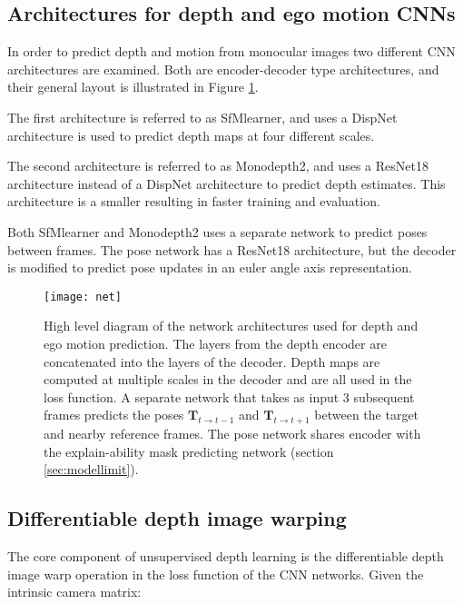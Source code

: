 

\subsection{Architectures for depth and ego motion CNNs}

In order to predict depth and motion from monocular images two different CNN architectures are examined. Both are encoder-decoder type architectures, and their general layout is illustrated in Figure \ref{fig:net}.

The first architecture is referred to as SfMlearner\cite{sfmlearner}, and uses a DispNet\cite{dispnet} architecture is used to predict depth maps at four different scales.

The second architecture is referred to as Monodepth2\cite{monodepth2}, and uses a ResNet18 architecture instead of a DispNet architecture to predict depth estimates. This architecture is a smaller resulting in faster training and evaluation.

Both SfMlearner and Monodepth2 uses a separate network to predict poses between frames. The pose network has a ResNet18\cite{resnet} architecture, but the decoder is modified to predict pose updates in an euler angle axis representation.

\begin{figure}[H]
	\centering
	\texttt{[image: net]}
	\caption{High level diagram of the network architectures used for depth and ego motion prediction. The layers from the depth encoder are concatenated into the layers of the decoder. Depth maps are computed at multiple scales in the decoder and are all used in the loss function. A separate network that takes as input 3 subsequent frames predicts the poses $\textbf{T}_{t\rightarrow t-1}$ and $\textbf{T}_{t\rightarrow t+1}$ between the target and nearby reference frames. The pose network shares encoder with the explain-ability mask predicting network (section \ref{sec:modellimit}).}
	\label{fig:net}
\end{figure}

\subsection{Differentiable depth image warping}
\label{sec:diffwarp}

The core component of unsupervised depth learning is the differentiable depth image warp operation in the loss function of the CNN networks. Given the intrinsic camera matrix:

